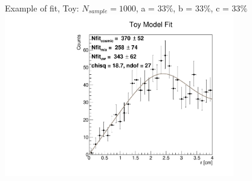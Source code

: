 \documentclass[9pt]{beamer}
\begin{document}
\begin{frame}{Example of fit, Toy: $N_{sample} = 1000$, a = $33\%$, b = $33\%$, c = $33\%$}
\includegraphics[width = 0.75\textwidth , left]{N1000/FitToy(33,33,33).pdf} 
\end{frame}
\end{document}
